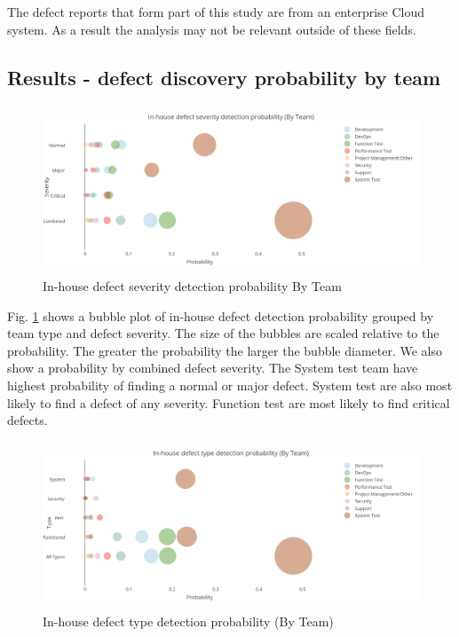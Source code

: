 The defect reports that form part of this study are from an enterprise Cloud system. As a result the analysis may not be relevant outside of these fields. \par

\subsection{Results - defect discovery probability by team}

\begin{figure}
\begin{center}
\caption{In-house defect severity detection probability By Team}
\label{fig:chapt3fig5}
\includegraphics[height=5cm, width=14cm]{graphs/dogfood/Graph1.png} 
\end{center}
\end{figure}

Fig. \ref{fig:chapt3fig5} shows a bubble plot of in-house defect detection probability grouped by team type and defect severity. The size of the bubbles are scaled relative to the probability. The greater the probability the larger the bubble diameter. We also
show a probability by combined defect severity. The System test team have highest probability of finding a normal or major defect. System test are also most likely to find a defect of any severity. Function test are most likely to find critical defects.

\begin{figure}
\begin{center}
\caption{In-house defect type detection probability (By Team)}
\label{fig:chapt3fig6}
\includegraphics[height=5cm, width=12cm]{graphs/dogfood/Graph2.png} 
\end{center}
\end{figure}



